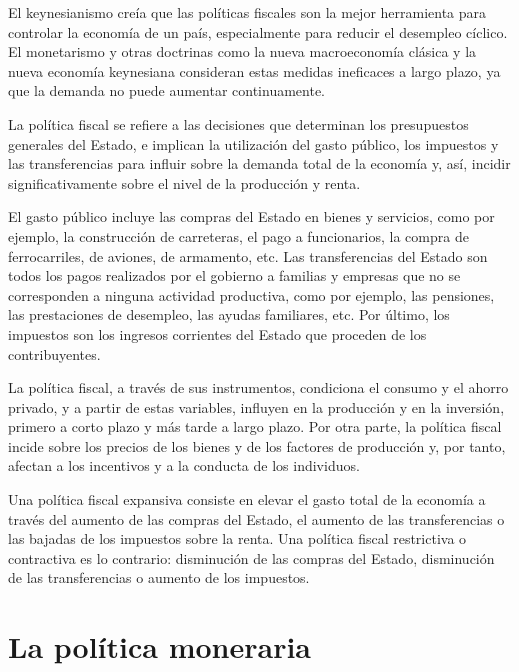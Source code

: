 \documentclass[
]{krantz}
\begin{document}
El keynesianismo creía que las políticas fiscales son la mejor herramienta para controlar la economía de un país, especialmente para reducir el desempleo cíclico. El monetarismo y otras doctrinas como la nueva macroeconomía clásica y la nueva economía keynesiana consideran estas medidas ineficaces a largo plazo, ya que la demanda no puede aumentar continuamente.

La política fiscal se refiere a las decisiones que determinan los presupuestos generales del Estado, e implican la utilización del gasto público, los impuestos y las transferencias para influir sobre la demanda total de la economía y, así, incidir significativamente sobre el nivel de la producción y renta.

El gasto público incluye las compras del Estado en bienes y servicios, como por ejemplo, la construcción de carreteras, el pago a funcionarios, la compra de ferrocarriles, de aviones, de armamento, etc. Las transferencias del Estado son todos los pagos realizados por el gobierno a familias y empresas que no se corresponden a ninguna actividad productiva, como por ejemplo, las pensiones, las prestaciones de desempleo, las ayudas familiares, etc. Por último, los impuestos son los ingresos corrientes del Estado que proceden de los contribuyentes.

La política fiscal, a través de sus instrumentos, condiciona el consumo y el ahorro privado, y a partir de estas variables, influyen en la producción y en la inversión, primero a corto plazo y más tarde a largo plazo. Por otra parte, la política fiscal incide sobre los precios de los bienes y de los factores de producción y, por tanto, afectan a los incentivos y a la conducta de los individuos.

Una política fiscal expansiva consiste en elevar el gasto total de la economía a través del aumento de las compras del Estado, el aumento de las transferencias o las bajadas de los impuestos sobre la renta. Una política fiscal restrictiva o contractiva es lo contrario: disminución de las compras del Estado, disminución de las transferencias o aumento de los impuestos.

\hypertarget{la-poluxedtica-moneraria}{%
\section{La política moneraria}\label{la-poluxedtica-moneraria}}
\end{document}
